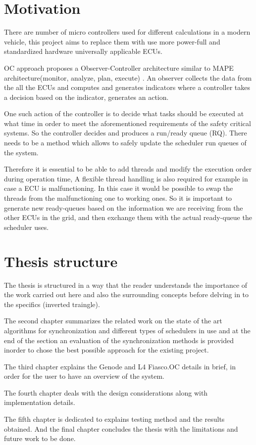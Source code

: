 \section{Motivation}

There are number of micro controllers used for different calculations in a modern vehicle, this project aims to replace them with use more power-full and standardized hardware universally applicable ECUs. 

OC approach proposes a Observer-Controller architecture similar to MAPE architecture(monitor, analyze, plan, execute) . An observer collects the data from the all the ECUs and computes and generates indicators where a controller takes a decision based on the indicator, generates an action.

One such action of the controller is to decide what tasks should be executed at what time in order to meet the aforementioned requirements of the safety critical systems. So the controller decides and produces a run/ready queue (RQ). There needs to be a method which allows to safely update the scheduler run queues of the system. 

Therefore it is essential to be able to add threads and modify the execution order 
during operation time, A flexible thread handling is also required for example in case 
a ECU is malfunctioning. In this case it would be possible to swap the threads from the 
malfunctioning one to working ones. So it is important to generate new ready-queues 
based on the information we are receiving from the other ECUs in the grid, and then 
exchange them with the actual ready-queue the scheduler uses.

\section{Thesis structure}
The thesis is structured in a way that the reader understands the importance of the work carried out here and also the surrounding concepts before delving in to the specifics (inverted traingle). 

The second chapter summarizes the related work on the state of the art algorithms for synchronization and different types of schedulers in use and at the end of the section an evaluation of the synchronization methods is provided inorder to chose the best possible approach for the existing project.

The third chapter explains the Genode and L4 Fiasco.OC details in brief, in order for the user to have an overview of the system. 

The fourth chapter deals with the design considerations along with implementation details.

The fifth chapter is dedicated to explains testing method and the results obtained.
And the final chapter concludes the thesis with the limitations and future work to be done. 

